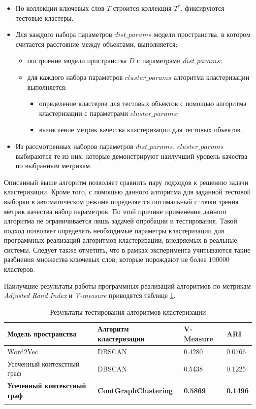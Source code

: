 \begin{itemize}
    \item По коллекции ключевых слов $T$ строится коллекция $T^*$, фиксируются тестовые кластеры.
    \item Для каждого набора параметров $dist\_params$ модели пространства, в котором считается расстояние между объектами, выполняется:
        \begin{itemize}
            \item построение модели пространства $D$ с параметрами $dist\_params$;
            \item для каждого набора параметров $cluster\_params$ алгоритма кластеризации выполняется:    
            \begin{itemize}
                \item определение кластеров для тестовых объектов с помощью алгоритма кластеризации с параметрами $cluster\_params$;
                \item вычисление метрик качества кластеризации для тестовых объектов.    
            \end{itemize}
        \end{itemize}
    \item Из рассмотренных наборов параметров $dist\_params$, $cluster\_params$ выбираются те из них, которые демонстрируют наилучший уровень качества по выбранным метрикам.
\end{itemize}

Описанный выше алгоритм позволяет сравнить пару подходов к решению задачи кластеризации. Кроме того, с помощью данного алгоритма для заданной тестовой выборки в автоматическом режиме определяется оптимальный с точки зрения метрик качества набор параметров. По этой причине применение данного алгоритма не ограничивается лишь задачей опробации и тестирования. Такой подход позволяет определять необходимые параметры кластеризации для программных реализаций алгоритмов кластеризации, внедряемых в реальные системы. Следует также отметить, что в рамках эксперимента учитываются такие разбиения множества ключевых слов, которые порождают не более $100000$ кластеров.

Наилучшие результаты работы программных реализаций алгоритмов по метрикам \emph{Adjusted Rand Index} и \emph{V-measure}  приводятся таблице \ref{tbl:clustering_test_1}.

\begin{table}[htb]
\small
\begin{tabularx}{16cm}{|X|X|X|X|} 
        \hline
        Модель пространства & Алгоритм кластеризации & V-Measure & ARI \\ \hline 
        Word2Vec & DBSCAN & 0.4280 & 0.0766\\ \hline
        Усеченный контекстный граф & DBSCAN & 0.5438 & 0.1225 \\ \hline
        \textbf{Усеченный контекстный граф} & \textbf{ContGraphClustering} & \textbf{0.5869} & \textbf{0.1496} \\ \hline 
        \caption{Результаты тестирования алгоритмов кластеризации} \label{tbl:clustering_test_1}
\end{tabularx}
\end{table}

